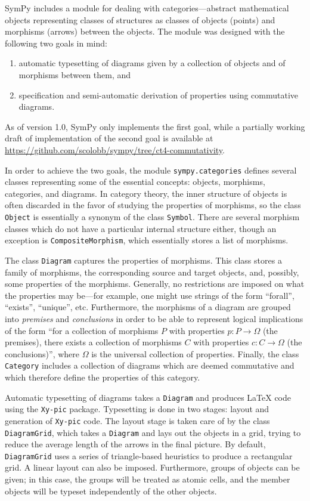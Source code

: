 SymPy includes a module for dealing with categories---abstract mathematical
objects representing classes of structures as classes of objects (points) and
morphisms (arrows) between the objects. The module was
designed with the following two goals in mind:

\begin{enumerate}
\item automatic typesetting of diagrams given by a collection of
  objects and of morphisms between them, and
\item specification and semi-automatic derivation of properties
  using commutative diagrams.
\end{enumerate}

As of version 1.0, SymPy only implements the first goal, while a partially
working draft of implementation of the second goal is available at
\url{https://github.com/scolobb/sympy/tree/ct4-commutativity}.

In order to achieve the two goals, the module \texttt{sympy.categories} defines
several classes representing some of the essential concepts: objects, morphisms,
categories, and diagrams.  In category theory, the inner structure of objects is
often discarded in the favor of studying the properties of morphisms, so the
class \texttt{Object} is essentially a synonym of the class \texttt{Symbol}.
There are several morphism classes which do not have a particular internal
structure either, though an exception is \texttt{CompositeMorphism}, which
essentially stores a list of morphisms.

The class \texttt{Diagram} captures the properties of morphisms. This class
stores a family of morphisms, the corresponding source and target objects,
and, possibly, some properties of the morphisms. Generally, no restrictions
are imposed on what the properties may be---for example, one might use strings
of the form ``forall'', ``exists'', ``unique'', etc. Furthermore, the
morphisms of a diagram are grouped into \textit{premises} and
\textit{conclusions} in order to be able to represent logical implications of
the form ``for a collection of morphisms $P$ with properties $p:P\to \Omega$
(the premises), there exists a collection of morphisms $C$ with properties
$c:C\to \Omega$ (the conclusions)'', where $\Omega$ is the universal
collection of properties. Finally, the class \texttt{Category} includes a
collection of diagrams which are deemed commutative and which therefore define
the properties of this category.

Automatic typesetting of diagrams takes a \texttt{Diagram} and produces \LaTeX{}
code using the \texttt{Xy-pic} package.  Typesetting is done in two stages:
layout and generation of \texttt{Xy-pic} code.  The layout stage is taken care
of by the class \texttt{DiagramGrid}, which takes a \texttt{Diagram} and lays out
the objects in a grid, trying to reduce the average length of the arrows in the
final picture.  By default, \texttt{DiagramGrid} uses a series of triangle-based
heuristics to produce a rectangular grid.  A linear layout can also be imposed.
Furthermore, groups of objects can be given; in this case, the groups will be
treated as atomic cells, and the member objects will be typeset independently of
the other objects.

